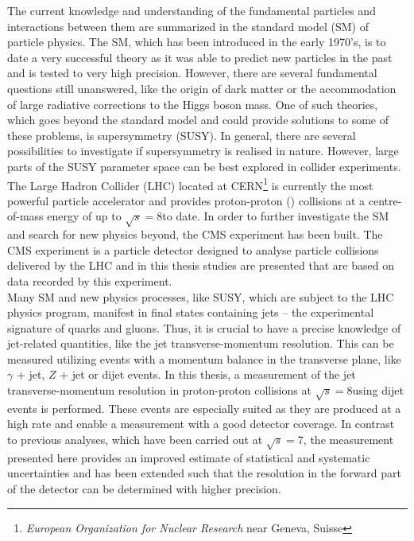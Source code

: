 The current knowledge and understanding of the fundamental particles and interactions between them are summarized in the standard model (SM) of particle physics. The SM, which has been introduced in the early 1970's, is to date a very successful theory as it was able to predict new particles in the past and is tested to very high precision. However, there are several fundamental questions still unanswered, like the origin of dark matter or the accommodation of large radiative corrections to the Higgs boson mass. One of such theories, which goes beyond the standard model and could provide solutions to some of these problems, is supersymmetry (SUSY). In general, there are several possibilities to investigate if supersymmetry is realised in nature. However, large parts of the SUSY parameter space can be best explored in collider experiments. \\
The Large Hadron Collider (LHC) located at CERN\footnote{\textit{European Organization for Nuclear Research} near Geneva, Suisse} is currently the most powerful particle accelerator and provides proton-proton (\pp) collisions at a centre-of-mass energy of up to $\sqrt{s} = 8$\tev to date. In order to further investigate the SM and search for new physics beyond, the CMS experiment has been built. The CMS experiment is a particle detector designed to analyse particle collisions delivered by the LHC and in this thesis studies are presented that are based on data recorded by this experiment. \\ 
Many SM and new physics processes, like SUSY, which are subject to the LHC physics program, manifest in final states containing jets -- the experimental signature of quarks and gluons. Thus, it is crucial to have a precise knowledge of jet-related quantities, like the jet transverse-momentum resolution. This can be measured utilizing events with a momentum balance in the transverse plane, like $\gamma$ + jet, $Z$ + jet or dijet events. In this thesis, a measurement of the jet transverse-momentum resolution in proton-proton collisions at $\sqrt{s} = 8$\tev using dijet events is performed. These events are especially suited as they are produced at a high rate and enable a measurement with a good detector coverage. In contrast to previous analyses, which have been carried out at $\sqrt{s} = 7$\tev, the measurement presented here provides an improved estimate of statistical and systematic uncertainties and has been extended such that the resolution in the forward part of the detector can be determined with higher precision. \\
